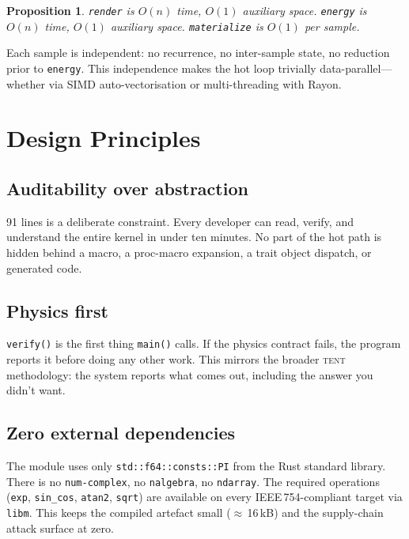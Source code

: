 \documentclass[11pt,a4paper]{article}
\newtheorem{proposition}[theorem]{Proposition}
\theoremstyle{definition}
\newcommand{\TENT}{\textsc{tent}}
\newcommand{\CB}[1]{\texttt{#1}}
\begin{document}
\begin{proposition}
  \CB{render} is $O(n)$ time, $O(1)$ auxiliary space.
  \CB{energy} is $O(n)$ time, $O(1)$ auxiliary space.
  \CB{materialize} is $O(1)$ per sample.
\end{proposition}

Each sample is independent: no recurrence, no inter-sample state, no
reduction prior to \CB{energy}.  This independence makes the hot loop
trivially data-parallel---whether via SIMD auto-vectorisation or
multi-threading with Rayon.

\section{Design Principles}

\subsection{Auditability over abstraction}

91 lines is a deliberate constraint.  Every developer can read, verify,
and understand the entire kernel in under ten minutes.  No part of the
hot path is hidden behind a macro, a proc-macro expansion, a trait
object dispatch, or generated code.

\subsection{Physics first}

\CB{verify()} is the first thing \CB{main()} calls.  If the physics
contract fails, the program reports it before doing any other work.
This mirrors the broader \TENT{} methodology: the system reports what
comes out, including the answer you didn't want.

\subsection{Zero external dependencies}

The module uses only \CB{std::f64::consts::PI} from the Rust standard
library.  There is no \CB{num-complex}, no \CB{nalgebra}, no
\CB{ndarray}.  The required operations (\CB{exp}, \CB{sin\_cos},
\CB{atan2}, \CB{sqrt}) are available on every IEEE\,754-compliant
target via \CB{libm}.  This keeps the compiled artefact small
($\approx$\,16\,kB) and the supply-chain attack surface at zero.
\end{document}
